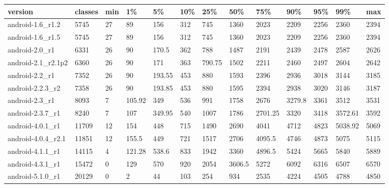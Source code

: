 \begin{tabular}{|l|l|l|l|l|l|l|l|l|l|l|l|l|}
\hline
version&classes&min&1\%&5\%&10\%&25\%&50\%&75\%&90\%&95\%&99\%&max\\
\hline
android-1.6\_r1.2&5745&27&89&156&312&745&1360&2023&2209&2256&2360&2394\\
\hline
android-1.6\_r1.5&5745&27&89&156&312&745&1360&2023&2209&2256&2360&2394\\
\hline
android-2.0\_r1&6331&26&90&170.5&362&788&1487&2191&2439&2478&2587&2626\\
\hline
android-2.1\_r2.1p2&6360&26&90&171&363&790.75&1502&2211&2460&2497&2604&2642\\
\hline
android-2.2\_r1&7352&26&90&193.55&453&880&1593&2396&2936&3018&3144&3185\\
\hline
android-2.2.3\_r2&7358&26&90&193.85&453&880&1595&2394&2938&3020&3146&3187\\
\hline
android-2.3\_r1&8093&7&105.92&349&536&991&1758&2676&3279.8&3361&3512&3531\\
\hline
android-2.3.7\_r1&8240&7&107&349.95&540&1007&1786&2701.25&3320&3418&3572.61&3592\\
\hline
android-4.0.1\_r1&11709&12&154&448&715&1490&2690&4041&4712&4823&5038.92&5069\\
\hline
android-4.0.4\_r2.1&11851&12&155.5&449&721&1517&2706&4095.5&4746&4873&5075&5115\\
\hline
android-4.1.1\_r1&14115&4&121.28&538.6&833&1942&3360&4896.5&5424&5665&5840&5889\\
\hline
android-4.3.1\_r1&15472&0&129&570&920&2054&3606.5&5272&6092&6316&6507&6570\\
\hline
android-5.1.0\_r1&20129&0&2&44&103&254&934&2535&4224&4505&4788&4850\\
\hline
\end{tabular}
